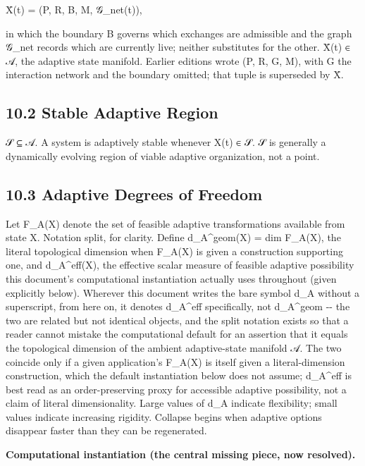\documentclass[
]{article}
\begin{document}
X̄(t) = (P, R, B, M, 𝒢\_net(t)),

in which the boundary B governs which exchanges are admissible and the
graph 𝒢\_net records which are currently live; neither substitutes for
the other. X̄(t) ∈ 𝒜, the adaptive state manifold. Earlier editions wrote
(P, R, G, M), with G the interaction network and the boundary omitted;
that tuple is superseded by X̄.

\hypertarget{stable-adaptive-region}{%
\subsection{10.2 Stable Adaptive Region}\label{stable-adaptive-region}}

𝒮 ⊆ 𝒜. A system is adaptively stable whenever X(t) ∈ 𝒮. 𝒮 is generally a
dynamically evolving region of viable adaptive organization, not a
point.

\hypertarget{adaptive-degrees-of-freedom}{%
\subsection{10.3 Adaptive Degrees of
Freedom}\label{adaptive-degrees-of-freedom}}

Let F\_A(X) denote the set of feasible adaptive transformations
available from state X. Notation split, for clarity. Define
d\_A\^{}geom(X) = dim F\_A(X), the literal topological dimension when
F\_A(X) is given a construction supporting one, and d\_A\^{}eff(X), the
effective scalar measure of feasible adaptive possibility this
document's computational instantiation actually uses throughout (given
explicitly below). Wherever this document writes the bare symbol d\_A
without a superscript, from here on, it denotes d\_A\^{}eff
specifically, not d\_A\^{}geom -\/- the two are related but not
identical objects, and the split notation exists so that a reader cannot
mistake the computational default for an assertion that it equals the
topological dimension of the ambient adaptive-state manifold 𝒜. The two
coincide only if a given application's F\_A(X) is itself given a
literal-dimension construction, which the default instantiation below
does not assume; d\_A\^{}eff is best read as an order-preserving proxy
for accessible adaptive possibility, not a claim of literal
dimensionality. Large values of d\_A indicate flexibility; small values
indicate increasing rigidity. Collapse begins when adaptive options
disappear faster than they can be regenerated.

\textbf{Computational instantiation (the central missing piece, now
resolved).}
\end{document}
